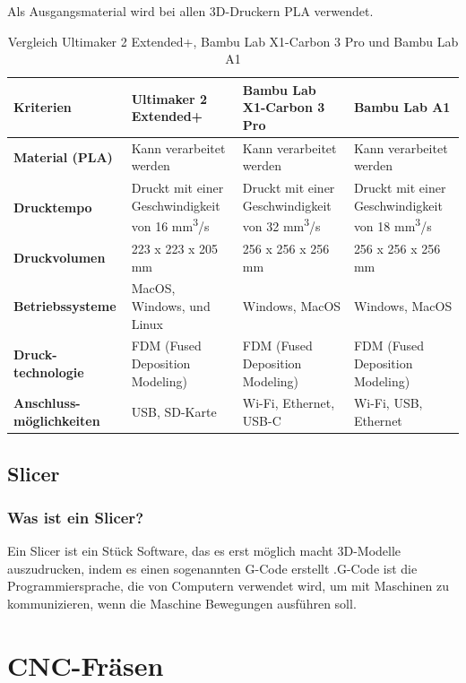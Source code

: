Als Ausgangsmaterial wird bei allen 3D-Druckern PLA verwendet.
\begin{table} [H]
	\begin{tabular}{ |p{2.7cm} |p{4cm}|p{4cm}|p{4cm}| }
		\hline
		\textbf{Kriterien} & \textbf{Ultimaker 2 Extended+} & \textbf{Bambu Lab X1-Carbon 3 Pro} & \textbf{Bambu Lab A1} \\
		\hline
		\textbf{Material (PLA)} & Kann verarbeitet werden & Kann verarbeitet werden & Kann verarbeitet werden \\
		\hline
		\textbf{Drucktempo} & Druckt mit einer Geschwindigkeit von 16 mm\textsuperscript{3}/s & Druckt mit einer Geschwindigkeit von 32 mm\textsuperscript{3}/s & Druckt mit einer Geschwindigkeit von 18 mm\textsuperscript{3}/s \\
		\hline
		\textbf{Druckvolumen} & 223 x 223 x 205 mm & 256 x 256 x 256 mm & 256 x 256 x 256 mm \\
		\hline
		\textbf{Betriebssysteme} & MacOS, Windows, und Linux & Windows, MacOS & Windows, MacOS \\
		\hline
		\textbf{Druck-technologie} & FDM (Fused Deposition Modeling) & FDM (Fused Deposition Modeling) & FDM (Fused Deposition Modeling) \\
		\hline
		\textbf{Anschluss-möglichkeiten} & USB, SD-Karte & Wi-Fi, Ethernet, USB-C & Wi-Fi, USB, Ethernet \\
		\hline
	\end{tabular}
	\caption{Vergleich Ultimaker 2 Extended+, Bambu Lab X1-Carbon 3 Pro und Bambu Lab A1}
\end{table}



\subsection{Slicer}
\subsubsection{Was ist ein Slicer?}
Ein Slicer ist ein Stück Software, das es erst möglich macht 3D-Modelle auszudrucken, indem es einen sogenannten G-Code erstellt .G-Code ist die Programmiersprache, die von Computern verwendet wird, um mit Maschinen zu kommunizieren, wenn die Maschine Bewegungen ausführen soll. \parencite{SlicerGCode} \\


\newpage
\section{CNC-Fräsen}

